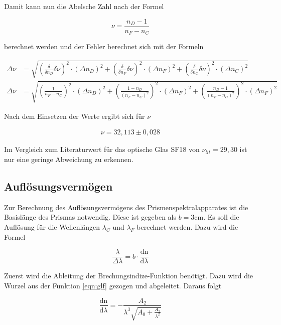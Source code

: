 Damit kann nun die Abelsche Zahl nach der Formel 

\begin{equation}
  \nu = \frac{n_D-1}{n_F-n_C}
  \label{eqn:abel}
\end{equation}

berechnet werden und der Fehler berechnet sich mit der Formeln

\begin{align*}
  \Delta \nu &= \sqrt{\left(\frac{\delta}{\delta n_D}\delta \nu \right)^2 \cdot \left(\Delta n_D\right)^2 + \left(\frac{\delta}{\delta n_F}\delta \nu \right)^2 \cdot \left(\Delta n_F\right)^2+\left(\frac{\delta}{\delta n_C}\delta \nu \right)^2 \cdot \left(\Delta n_C\right)^2} \\
  \Delta \nu &= \sqrt{\left(\frac{1}{n_F - n_C}\right)^2\cdot \left(\Delta n_D\right)^2 + \left(\frac{1-n_D}{\left(n_F-n_C\right)^2}\right)^2\cdot \left(\Delta n_F\right)^2 + \left(\frac{n_D - 1}{\left(n_F-n_C\right)^2}\right)^2\cdot \left(\Delta n_F\right)^2}
\end{align*}

Nach dem Einsetzen der Werte ergibt sich für $\nu$

\begin{align*}
  \nu = 32,113 \pm 0,028
\end{align*}

Im Vergleich zum Literaturwert für das optische Glas SF18 von $\nu_{lit} = 29,30$ \cite{ref2} ist nur eine geringe Abweichung zu erkennen.

\subsection{Auflösungsvermögen}

Zur Berechnung des Auflösungsvermögens des Prismenspektralapparates  ist die Basislänge des Prismas notwendig.
Diese ist gegeben als $b = 3$cm.
Es soll die Auflösung für die Wellenlängen $\lambda_C$ und $\lambda_F$ berechnet werden.
Dazu wird die Formel

\begin{equation}
  \frac{\lambda}{\Delta \lambda} = b \cdot \frac{\text{dn}}{\text{d}\lambda}
  \label{eqn:aufl}
\end{equation}

Zuerst wird die Ableitung der Brechungsindize-Funktion benötigt.
Dazu wird die Wurzel aus der Funktion \eqref{eqn:glf} gezogen und abgeleitet.
Daraus folgt

\begin{equation}
  \frac{\text{dn}}{\text{d}\lambda} = - \frac{A_2}{\lambda^3 \sqrt{A_0 + \frac{A_2}{\lambda^2}}}
  \label{eqn:ableitung}
\end{equation}

